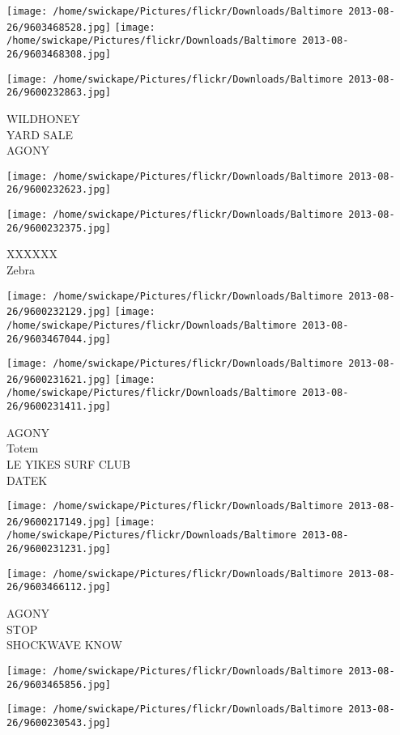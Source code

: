 \documentclass[10pt,letterpaper]{article}
\begin{document}
\texttt{[image: /home/swickape/Pictures/flickr/Downloads/Baltimore 2013-08-26/9603468528.jpg]}
\texttt{[image: /home/swickape/Pictures/flickr/Downloads/Baltimore 2013-08-26/9603468308.jpg]}

\texttt{[image: /home/swickape/Pictures/flickr/Downloads/Baltimore 2013-08-26/9600232863.jpg]}

WILDHONEY\\
YARD SALE\\
AGONY
\pagebreak

\texttt{[image: /home/swickape/Pictures/flickr/Downloads/Baltimore 2013-08-26/9600232623.jpg]}

\vspace{0.25in}
\texttt{[image: /home/swickape/Pictures/flickr/Downloads/Baltimore 2013-08-26/9600232375.jpg]}

XXXXXX\\
Zebra
\pagebreak

\texttt{[image: /home/swickape/Pictures/flickr/Downloads/Baltimore 2013-08-26/9600232129.jpg]}
\texttt{[image: /home/swickape/Pictures/flickr/Downloads/Baltimore 2013-08-26/9603467044.jpg]}

\texttt{[image: /home/swickape/Pictures/flickr/Downloads/Baltimore 2013-08-26/9600231621.jpg]}
\texttt{[image: /home/swickape/Pictures/flickr/Downloads/Baltimore 2013-08-26/9600231411.jpg]}

AGONY\\
Totem\\
LE YIKES SURF CLUB\\
DATEK
\pagebreak

\texttt{[image: /home/swickape/Pictures/flickr/Downloads/Baltimore 2013-08-26/9600217149.jpg]}
\texttt{[image: /home/swickape/Pictures/flickr/Downloads/Baltimore 2013-08-26/9600231231.jpg]}

\vspace{0.25in}
\texttt{[image: /home/swickape/Pictures/flickr/Downloads/Baltimore 2013-08-26/9603466112.jpg]}

AGONY\\
STOP\\
SHOCKWAVE KNOW
\pagebreak

\texttt{[image: /home/swickape/Pictures/flickr/Downloads/Baltimore 2013-08-26/9603465856.jpg]}

\vspace{0.25in}
\texttt{[image: /home/swickape/Pictures/flickr/Downloads/Baltimore 2013-08-26/9600230543.jpg]}
\end{document}
